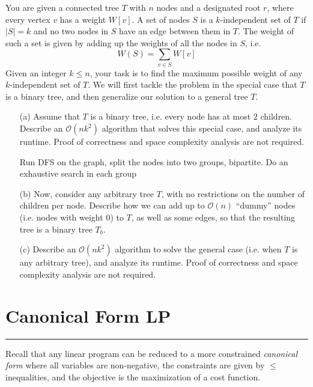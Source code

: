 \documentclass{article}
\begin{document}
You are given a connected tree $T$ with $n$ nodes and a designated root $r$, where every vertex $v$ has a weight $W[v]$. A set of nodes $S$ is a $k$-independent set of $T$ if $\lvert S \rvert = k$ and no two nodes in $S$ have an edge between them in $T$. The weight of such a set is given by adding up the weights of all the nodes in $S$, i.e.
    \begin{equation*}
        W(S) = \sum_{v \in S} W[v]
    \end{equation*}
Given an integer $k \leq n$, your task is to find the maximum possible weight of any $k$-independent set of $T$. We will first tackle the problem in the special case that $T$ is a binary tree, and then generalize our solution to a general tree $T$.
    \begin{itemize}
        \item [(a)] Assume that $T$ is a binary tree, i.e. every node has at most $2$ children. Describe an $\mathcal{O}(nk^{2})$ algorithm that solves this special case, and analyze its runtime. Proof of correctness and space complexity analysis are not required.
            \begin{answer}
                Run DFS on the graph, split the nodes into two groups, bipartite. Do an exhaustive search in each group 
            \end{answer}

        \item [(b)] Now, consider any arbitrary tree $T$, with no restrictions on the number of children per node. Describe how we can add up to $\mathcal{O}(n)$ ``dummy'' nodes (i.e. nodes with weight $0$) to $T$, as well as some edges, so that the resulting tree is a binary tree $T_{b}$.

        \item [(c)] Describe an $\mathcal{O}(nk^{2})$ algorithm to solve the general case (i.e. when $T$ is any arbitrary tree), and analyze its runtime. Proof of correctness and space complexity analysis are not required.
    \end{itemize}

\newpage
\section*{Canonical Form LP}
\hrule

Recall that any linear program can be reduced to a more constrained \textit{canonical form} where all variables are non-negative, the constraints are given by $\leq$ inequalities, and the objective is the maximization of a cost function.
\end{document}
